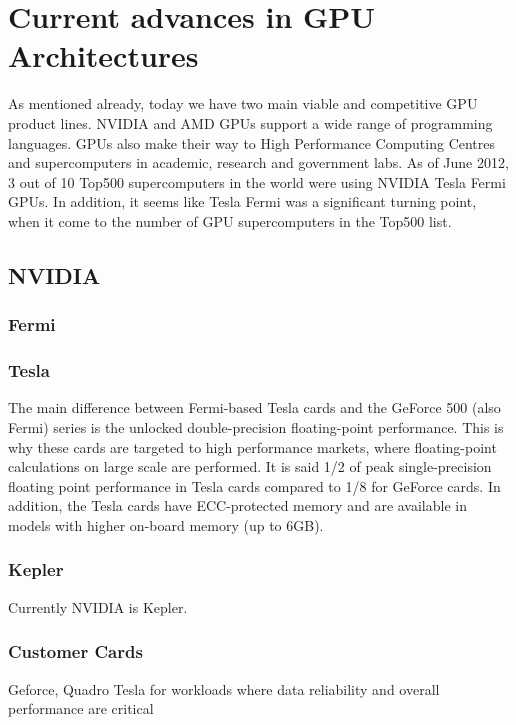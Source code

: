 \section{Current advances in GPU Architectures}
As mentioned already, today we have two main viable and competitive GPU product lines. NVIDIA and AMD GPUs support a wide range of programming languages. GPUs also make their way to High Performance Computing Centres and supercomputers in academic, research and government labs. As of June 2012, 3 out of 10 Top500 supercomputers in the world were using NVIDIA Tesla Fermi GPUs. In addition, it seems like Tesla Fermi was a significant turning point, when it come to the number of GPU supercomputers in the Top500 list.


\subsection{NVIDIA}
\subsubsection{Fermi}

\subsubsection{Tesla}
The main difference between Fermi-based Tesla cards and the GeForce 500 (also Fermi) series is the unlocked double-precision floating-point performance. This is why these cards are targeted to high performance markets, where floating-point calculations on large scale are performed. It is said 1/2 of peak single-precision floating point performance in Tesla cards compared to 1/8 for GeForce cards. In addition, the Tesla cards have ECC-protected memory and are available in models with higher on-board memory (up to 6GB).

\subsubsection{Kepler}
Currently NVIDIA is Kepler.



\subsubsection{Customer Cards}
Geforce, Quadro
Tesla for workloads where data reliability and overall performance are critical 




